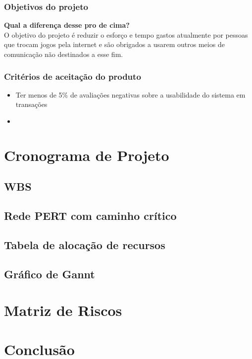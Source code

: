 \documentclass[a4paper,11pt]{article}
\newcommand{\DUVIDA}[1]{\huge \textbf {\color{red} #1}\normalsize\\} %
\begin{document}
		\subsubsection{Objetivos do projeto}
			\DUVIDA{Qual a diferença desse pro de cima?}
			O objetivo do projeto é reduzir o esforço e tempo gastos atualmente por pessoas que trocam jogos pela internet e são obrigados a usarem outros meios de comunicação não destinados a esse fim.
			
		\subsubsection{Critérios de aceitação do produto}
			\begin{itemize}
				\item Ter menos de 5\% de avaliações negativas sobre a usabilidade do sistema em transações
				\item 
			\end{itemize}
	
\section{Cronograma de Projeto}
	\subsection{WBS}
	\subsection{Rede PERT com caminho crítico}
	\subsection{Tabela de alocação de recursos}
	\subsection{Gráfico de Gannt}
	
\section{Matriz de Riscos}

\section{Conclusão}
\end{document}
